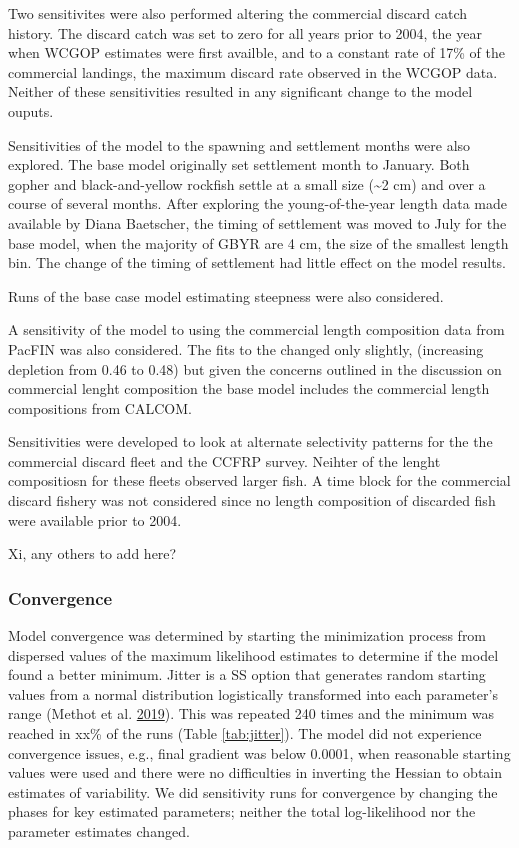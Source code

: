 \documentclass[12pt,]{article}
\begin{document}
Two sensitivites were also performed altering the commercial discard
catch history. The discard catch was set to zero for all years prior to
2004, the year when WCGOP estimates were first availble, and to a
constant rate of 17\% of the commercial landings, the maximum discard
rate observed in the WCGOP data. Neither of these sensitivities resulted
in any significant change to the model ouputs.

Sensitivities of the model to the spawning and settlement months were
also explored. The base model originally set settlement month to
January. Both gopher and black-and-yellow rockfish settle at a small
size (\textasciitilde{}2 cm) and over a course of several months. After
exploring the young-of-the-year length data made available by Diana
Baetscher, the timing of settlement was moved to July for the base
model, when the majority of GBYR are 4 cm, the size of the smallest
length bin. The change of the timing of settlement had little effect on
the model results.

Runs of the base case model estimating steepness were also considered.

A sensitivity of the model to using the commercial length composition
data from PacFIN was also considered. The fits to the changed only
slightly, (increasing depletion from 0.46 to 0.48) but given the
concerns outlined in the discussion on commercial lenght composition the
base model includes the commercial length compositions from CALCOM.

Sensitivities were developed to look at alternate selectivity patterns
for the the commercial discard fleet and the CCFRP survey. Neihter of
the lenght compositiosn for these fleets observed larger fish. A time
block for the commercial discard fishery was not considered since no
length composition of discarded fish were available prior to 2004.

Xi, any others to add here?

\subsubsection{Convergence}\label{convergence}

Model convergence was determined by starting the minimization process
from dispersed values of the maximum likelihood estimates to determine
if the model found a better minimum. Jitter is a SS option that
generates random starting values from a normal distribution logistically
transformed into each parameter's range (Methot et al.
\protect\hyperlink{ref-Methot2019}{2019}). This was repeated 240 times
and the minimum was reached in xx\% of the runs (Table
\ref{tab:jitter}). The model did not experience convergence issues,
e.g., final gradient was below 0.0001, when reasonable starting values
were used and there were no difficulties in inverting the Hessian to
obtain estimates of variability. We did sensitivity runs for convergence
by changing the phases for key estimated parameters; neither the total
log-likelihood nor the parameter estimates changed.
\end{document}
